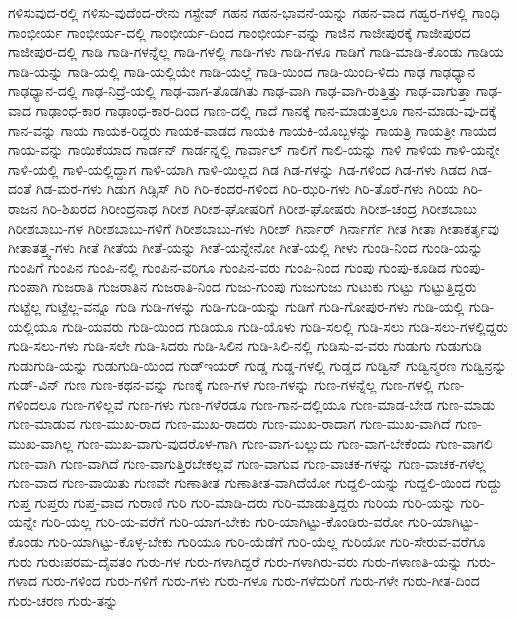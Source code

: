 {ಗಳಿಸುವುದ-ರಲ್ಲಿ
ಗಳಿಸು-ವುದೆಂದ-ರೇನು
ಗಸ್ಟೇವ್
ಗಹನ
ಗಹನ-ಭಾವನೆ-ಯನ್ನು
ಗಹನ-ವಾದ
ಗಹ್ವರ-ಗಳಲ್ಲಿ
ಗಾಂಧಿ
ಗಾಂಭೀರ್ಯ
ಗಾಂಭೀರ್ಯ-ದಲ್ಲಿ
ಗಾಂಭೀರ್ಯ-ದಿಂದ
ಗಾಂಭೀರ್ಯ-ವನ್ನು
ಗಾಜಿನ
ಗಾಜೀಪುರಕ್ಕೆ
ಗಾಜೀಪುರದ
ಗಾಜೀಪುರ-ದಲ್ಲಿ
ಗಾಡಿ
ಗಾಡಿ-ಗಳನ್ನೆಲ್ಲ
ಗಾಡಿ-ಗಳಲ್ಲಿ
ಗಾಡಿ-ಗಳು
ಗಾಡಿ-ಗಳೂ
ಗಾಡಿಗೆ
ಗಾಡಿ-ಮಾಡಿ-ಕೊಂಡು
ಗಾಡಿಯ
ಗಾಡಿ-ಯನ್ನು
ಗಾಡಿ-ಯಲ್ಲಿ
ಗಾಡಿ-ಯಲ್ಲಿಯೇ
ಗಾಡಿ-ಯಲ್ಲೆ
ಗಾಡಿ-ಯಿಂದ
ಗಾಡಿ-ಯಿಂದಿ-ಳಿದು
ಗಾಢ
ಗಾಢಧ್ಯಾನ
ಗಾಢಧ್ಯಾನ-ದಲ್ಲಿ
ಗಾಢ-ನಿದ್ರೆ-ಯಲ್ಲಿ
ಗಾಢ-ವಾಗ-ತೊಡಗಿತು
ಗಾಢ-ವಾಗಿ
ಗಾಢ-ವಾಗಿ-ರುತ್ತಿತ್ತು
ಗಾಢ-ವಾಗುತ್ತಾ
ಗಾಢ-ವಾದ
ಗಾಢಾಂಧ-ಕಾರ
ಗಾಢಾಂಧ-ಕಾರ-ದಿಂದ
ಗಾಣ-ದಲ್ಲಿ
ಗಾದೆ
ಗಾನಕ್ಕೆ
ಗಾನ-ಮಾಡುತ್ತಲೂ
ಗಾನ-ಮಾಡು-ವು-ದಕ್ಕೆ
ಗಾನ-ವನ್ನು
ಗಾಯ
ಗಾಯಕ-ರಿದ್ದರು
ಗಾಯಕ-ವಾಡದ
ಗಾಯಕಿ
ಗಾಯಕಿ-ಯೊಬ್ಬಳನ್ನು
ಗಾಯತ್ರಿ
ಗಾಯತ್ರೀ
ಗಾಯದ
ಗಾಯ-ವನ್ನು
ಗಾಯಿಕೆಯಾದ
ಗಾರ್ಡನ್
ಗಾರ್ಡನ್ನಲ್ಲಿ
ಗಾರ್ವಾಲ್
ಗಾಲಿಗೆ
ಗಾಲಿ-ಯನ್ನು
ಗಾಳಿ
ಗಾಳಿಯ
ಗಾಳಿ-ಯನ್ನೇ
ಗಾಳಿ-ಯಲ್ಲಿ
ಗಾಳಿ-ಯಲ್ಲಿದ್ದಾಗ
ಗಾಳಿ-ಯಾಗಿ
ಗಾಳಿ-ಯಿಲ್ಲದ
ಗಿಡ
ಗಿಡ-ಗಳನ್ನು
ಗಿಡ-ಗಳಿಂದ
ಗಿಡ-ಗಳು
ಗಿಡದ
ಗಿಡ-ದಂತೆ
ಗಿಡ-ಮರ-ಗಳು
ಗಿಡುಗ
ಗಿಡ್ಸಿಸ್
ಗಿರಿ
ಗಿರಿ-ಕಂದರ-ಗಳಿಂದ
ಗಿರಿ-ಝರಿ-ಗಳು
ಗಿರಿ-ತೊರೆ-ಗಳು
ಗಿರಿಯ
ಗಿರಿ-ರಾಜನ
ಗಿರಿ-ಶಿಖರದ
ಗಿರೀಂದ್ರನಾಥ
ಗಿರೀಶ
ಗಿರೀಶ-ಘೋಷರಿಗೆ
ಗಿರೀಶ-ಘೋಷರು
ಗಿರೀಶ-ಚಂದ್ರ
ಗಿರೀಶಬಾಬು
ಗಿರೀಶಬಾಬು-ಗಳ
ಗಿರೀಶಬಾಬು-ಗಳಿಗೆ
ಗಿರೀಶಬಾಬು-ಗಳು
ಗಿರೀಶ್
ಗಿರ್ನಾರ್
ಗಿರ್ನಾರ್ಗೆ
ಗೀತ
ಗೀತಾ
ಗೀತಾಕರ್ತೃವು
ಗೀತಾತತ್ತ್ವ-ಗಳು
ಗೀತೆ
ಗೀತೆಯ
ಗೀತೆ-ಯನ್ನು
ಗೀತೆ-ಯನ್ನೇನೋ
ಗೀತೆ-ಯಲ್ಲಿ
ಗೀಳು
ಗುಂಡಿ-ನಿಂದ
ಗುಂಡಿ-ಯನ್ನು
ಗುಂಪಿಗೆ
ಗುಂಪಿನ
ಗುಂಪಿ-ನಲ್ಲಿ
ಗುಂಪಿನ-ವರಿಗೂ
ಗುಂಪಿನ-ವರು
ಗುಂಪಿ-ನಿಂದ
ಗುಂಪು
ಗುಂಪು-ಕೂಡಿದ
ಗುಂಪು-ಗುಂಪಾಗಿ
ಗುಜರಾತಿ
ಗುಜರಾತಿನ
ಗುಜರಾತಿ-ನಿಂದ
ಗುಜು-ಗುಂಪು
ಗುಜುಗುಜು
ಗುಟುಕು
ಗುಟ್ಟು
ಗುಟ್ಟುತ್ತಿದ್ದರು
ಗುಟ್ಟೆಲ್ಲ
ಗುಟ್ಟೆಲ್ಲ-ವನ್ನೂ
ಗುಡಿ
ಗುಡಿ-ಗಳನ್ನು
ಗುಡಿ-ಗುಡಿ-ಯನ್ನು
ಗುಡಿಗೆ
ಗುಡಿ-ಗೋಪುರ-ಗಳು
ಗುಡಿ-ಯಲ್ಲಿ
ಗುಡಿ-ಯಲ್ಲಿಯೂ
ಗುಡಿ-ಯವರು
ಗುಡಿ-ಯಿಂದ
ಗುಡಿಯೂ
ಗುಡಿ-ಯೊಳು
ಗುಡಿ-ಸಲಲ್ಲಿ
ಗುಡಿ-ಸಲು
ಗುಡಿ-ಸಲು-ಗಳಲ್ಲಿದ್ದರು
ಗುಡಿ-ಸಲು-ಗಳು
ಗುಡಿ-ಸಲೇ
ಗುಡಿ-ಸಿದರು
ಗುಡಿ-ಸಿಲಿನ
ಗುಡಿ-ಸಿಲಿ-ನಲ್ಲಿ
ಗುಡಿಸು-ವ-ವರು
ಗುಡುಗು
ಗುಡುಗುಡಿ
ಗುಡುಗುಡಿ-ಯನ್ನು
ಗುಡುಗುಡಿ-ಯಿಂದ
ಗುಡ್ಇಯರ್
ಗುಡ್ಡ
ಗುಡ್ಡ-ಗಳಲ್ಲಿ
ಗುಡ್ಡದ
ಗುಡ್ವಿನ್
ಗುಡ್ವಿನ್ಮರಣ
ಗುಡ್ವಿನ್ರನ್ನು
ಗುಡ್-ವಿನ್
ಗುಣ
ಗುಣ-ಕಥನ-ವನ್ನು
ಗುಣಕ್ಕೆ
ಗುಣ-ಗಳ
ಗುಣ-ಗಳನ್ನು
ಗುಣ-ಗಳನ್ನೆಲ್ಲ
ಗುಣ-ಗಳಲ್ಲಿ
ಗುಣ-ಗಳಿಂದಲೂ
ಗುಣ-ಗಳಿಲ್ಲವೆ
ಗುಣ-ಗಳು
ಗುಣ-ಗಳೆರಡೂ
ಗುಣ-ಗಾನ-ದಲ್ಲಿಯೂ
ಗುಣ-ಮಾಡ-ಬೇಡ
ಗುಣ-ಮಾಡು
ಗುಣ-ಮಾಡುವ
ಗುಣ-ಮುಖ-ರಾದ
ಗುಣ-ಮುಖ-ರಾದರು
ಗುಣ-ಮುಖ-ರಾದಾಗ
ಗುಣ-ಮುಖ-ವಾಗಿದೆ
ಗುಣ-ಮುಖ-ವಾಗಿಲ್ಲ
ಗುಣ-ಮುಖ-ವಾಗು-ವುದರೊಳ-ಗಾಗಿ
ಗುಣ-ವಾಗ-ಬಲ್ಲುದು
ಗುಣ-ವಾಗ-ಬೇಕೆಂದು
ಗುಣ-ವಾಗಲಿ
ಗುಣ-ವಾಗಿ
ಗುಣ-ವಾಗಿದೆ
ಗುಣ-ವಾಗುತ್ತಿರಬೇಕಲ್ಲವೆ
ಗುಣ-ವಾಗುವ
ಗುಣ-ವಾಚಕ-ಗಳನ್ನು
ಗುಣ-ವಾಚಕ-ಗಳೆಲ್ಲ
ಗುಣ-ವಾದ
ಗುಣ-ವಾಯಿತು
ಗುಣವೇ
ಗುಣಾತೀತ
ಗುಣಾತೀತ-ವಾಗಿದೆಯೋ
ಗುದ್ದಲಿ-ಯನ್ನು
ಗುದ್ದಲಿ-ಯಿಂದ
ಗುದ್ದು
ಗುಪ್ತ
ಗುಪ್ತರು
ಗುಪ್ತ-ವಾದ
ಗುರಾಣಿ
ಗುರಿ
ಗುರಿ-ಮಾಡಿ-ದರು
ಗುರಿ-ಮಾಡುತ್ತಿದ್ದರು
ಗುರಿಯ
ಗುರಿ-ಯನ್ನು
ಗುರಿ-ಯನ್ನೇ
ಗುರಿ-ಯಲ್ಲ
ಗುರಿ-ಯ-ವರೆಗೆ
ಗುರಿ-ಯಾಗ-ಬೇಕು
ಗುರಿ-ಯಾಗಿಟ್ಟು-ಕೊಂಡಿರು-ವರೋ
ಗುರಿ-ಯಾಗಿಟ್ಟು-ಕೊಂಡು
ಗುರಿ-ಯಾಗಿಟ್ಟು-ಕೊಳ್ಳ-ಬೇಕು
ಗುರಿಯೂ
ಗುರಿ-ಯೆಡೆಗೆ
ಗುರಿ-ಯೆಲ್ಲ
ಗುರಿಯೋ
ಗುರಿ-ಸೇರುವ-ವರೆಗೂ
ಗುರು
ಗುರುಃಪರಮ-ದೈವತಂ
ಗುರು-ಗಳ
ಗುರು-ಗಳಾಗಿದ್ದರೆ
ಗುರು-ಗಳಾಗಿರು-ವರು
ಗುರು-ಗಳಾಣತಿ-ಯನ್ನು
ಗುರು-ಗಳಾದ
ಗುರು-ಗಳಿಂದ
ಗುರು-ಗಳಿಗೆ
ಗುರು-ಗಳು
ಗುರು-ಗಳೂ
ಗುರು-ಗಳೆದುರಿಗೆ
ಗುರು-ಗಳೇ
ಗುರು-ಗೀತ-ದಿಂದ
ಗುರು-ಚರಣ
ಗುರು-ತನ್ನು
}
